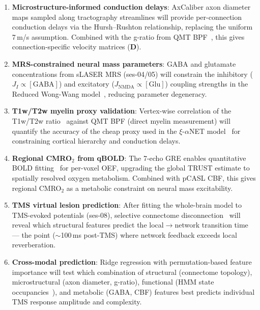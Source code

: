 \documentclass[11pt,a4paper]{article}\usepackage[]{graphicx}\usepackage[]{xcolor}
\begin{document}
\begin{enumerate}
  \item \textbf{Microstructure-informed conduction delays}: AxCaliber axon
    diameter maps sampled along tractography streamlines will provide
    per-connection conduction delays via the Hursh--Rushton relationship,
    replacing the uniform 7\,m/s assumption. Combined with the g-ratio
    from QMT BPF~\citep{Stikov2015gratio}, this gives connection-specific
    velocity matrices ($\mathbf{D}$).

  \item \textbf{MRS-constrained neural mass parameters}: GABA and glutamate
    concentrations from sLASER MRS (ses-04/05) will constrain the
    inhibitory ($J_I \propto [\text{GABA}]$) and excitatory
    ($J_\text{NMDA} \propto [\text{Glu}]$) coupling strengths in the
    Reduced Wong-Wang model~\citep{Deco2013rww}, reducing parameter
    degeneracy.

  \item \textbf{T1w/T2w myelin proxy validation}: Vertex-wise correlation
    of the T1w/T2w ratio~\citep{Glasser2011myelin} against QMT BPF
    (direct myelin measurement) will quantify the accuracy of the cheap
    proxy used in the $\xi$-$\alpha$NET model~\citep{ValdesSosa2026xialphanet}
    for constraining cortical hierarchy and conduction delays.

  \item \textbf{Regional CMRO$_2$ from qBOLD}: The 7-echo GRE enables
    quantitative BOLD fitting~\citep{He2007qbold} for per-voxel OEF,
    upgrading the global TRUST estimate to spatially resolved oxygen
    metabolism. Combined with pCASL CBF, this gives regional CMRO$_2$
    as a metabolic constraint on neural mass excitability.

  \item \textbf{TMS virtual lesion prediction}: After fitting the
    whole-brain model to TMS-evoked potentials (ses-08), selective
    connectome disconnection~\citep{Momi2023virtuallesion} will reveal
    which structural features predict the local$\to$network transition
    time --- the point ($\sim$100\,ms post-TMS) where network feedback
    exceeds local reverberation.

  \item \textbf{Cross-modal prediction}: Ridge regression with
    permutation-based feature importance will test which combination of
    structural (connectome topology), microstructural (axon diameter,
    g-ratio), functional (HMM state occupancies~\citep{Vidaurre2018hmm}),
    and metabolic (GABA, CBF) features best predicts individual TMS
    response amplitude and complexity.
\end{enumerate}
\end{document}
